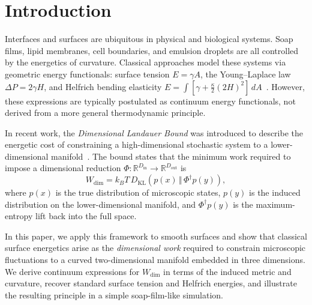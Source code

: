 \documentclass[aps,pre,twocolumn,superscriptaddress,floatfix]{revtex4-2}
\begin{document}
\maketitle

\section{Introduction}

Interfaces and surfaces are ubiquitous in physical and biological systems. Soap films, lipid membranes, cell boundaries, and emulsion droplets are all controlled by the energetics of curvature. Classical approaches model these systems via geometric energy functionals: surface tension $E = \gamma A$, the Young--Laplace law $\Delta P = 2\gamma H$, and Helfrich bending elasticity $E = \int [\gamma + \frac{\kappa}{2}(2H)^2]\,dA$~\cite{helfrich1973,safran1994}. However, these expressions are typically postulated as continuum energy functionals, not derived from a more general thermodynamic principle.

In recent work, the \emph{Dimensional Landauer Bound} was introduced to describe the energetic cost of constraining a high-dimensional stochastic system to a lower-dimensional manifold~\cite{todd2025landauer}. The bound states that the minimum work required to impose a dimensional reduction $\Phi:\mathbb{R}^{D_{\mathrm{in}}}\to\mathbb{R}^{D_{\mathrm{out}}}$ is
\begin{equation}
W_{\mathrm{dim}} = k_B T \, D_{\mathrm{KL}}(p(x)\,\Vert\,\Phi^\dagger p(y)),
\label{eq:dim_landauer}
\end{equation}
where $p(x)$ is the true distribution of microscopic states, $p(y)$ is the induced distribution on the lower-dimensional manifold, and $\Phi^\dagger p(y)$ is the maximum-entropy lift back into the full space.

In this paper, we apply this framework to smooth surfaces and show that classical surface energetics arise as the \emph{dimensional work} required to constrain microscopic fluctuations to a curved two-dimensional manifold embedded in three dimensions. We derive continuum expressions for $W_{\mathrm{dim}}$ in terms of the induced metric and curvature, recover standard surface tension and Helfrich energies, and illustrate the resulting principle in a simple soap-film-like simulation.

\end{document}
